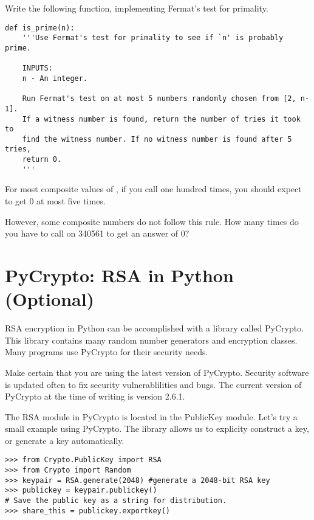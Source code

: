 \begin{problem}
Write the following function, implementing Fermat's test for primality.
\begin{lstlisting}
def is_prime(n):
    '''Use Fermat's test for primality to see if `n' is probably prime.
    
    INPUTS:
    n - An integer.
    
    Run Fermat's test on at most 5 numbers randomly chosen from [2, n-1]. 
    If a witness number is found, return the number of tries it took to 
    find the witness number. If no witness number is found after 5 tries, 
    return 0.
    '''
\end{lstlisting}
For most composite values of , if you call  one hundred times, you should expect to get 0 at most five times.

However, some composite numbers do not follow this rule. 
How many times do you have to call  on 340561 to get an answer of 0?
\label{prob:prime_confidence}
\end{problem}

\section*{PyCrypto: RSA in Python (Optional)}

RSA encryption in Python can be accomplished with a library called PyCrypto.
This library contains many random number generators and encryption classes.
Many programs use PyCrypto for their security needs.
\begin{warn}
Make certain that you are using the latest version of PyCrypto.
Security software is updated often to fix security vulnerablilities and bugs.
The current version of PyCrypto at the time of writing is version 2.6.1.
\end{warn}

The RSA module in PyCrypto is located in the PublicKey module.
Let's try a small example using PyCrypto.
The library allows us to explicity construct a key, or generate a key automatically.
\begin{lstlisting}
>>> from Crypto.PublicKey import RSA
>>> from Crypto import Random
>>> keypair = RSA.generate(2048) #generate a 2048-bit RSA key
>>> publickey = keypair.publickey()
# Save the public key as a string for distribution.
>>> share_this = publickey.exportkey()
\end{lstlisting}

